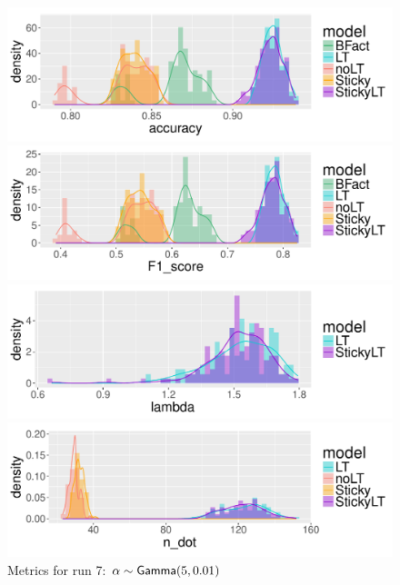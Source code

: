 \begin{figure}[tb]
  \centering
  \begin{minipage}{0.75\textwidth}
  \includegraphics[width = \textwidth]{fig/cocktail/synth_s16_m12/hyper_alpha/h10.0_nocs_cp0/a5b0p01/accuracy_density.pdf}
\end{minipage}

\begin{minipage}{0.75\textwidth}
  \includegraphics[width = \textwidth]{fig/cocktail/synth_s16_m12/hyper_alpha/h10.0_nocs_cp0/a5b0p01/F1_score_density.pdf}
\end{minipage}

\begin{minipage}{0.75\textwidth}
  \includegraphics[width = \textwidth]{fig/cocktail/synth_s16_m12/hyper_alpha/h10.0_nocs_cp0/a5b0p01/lambda_density.pdf}
\end{minipage}

\begin{minipage}{0.75\textwidth}
  \includegraphics[width = \textwidth]{fig/cocktail/synth_s16_m12/hyper_alpha/h10.0_nocs_cp0/a5b0p01/n_dot_density.pdf}
\end{minipage}
\caption{Metrics for run 7: $\alpha \sim \mathsf{Gamma}(5,0.01)$}
\end{figure}

